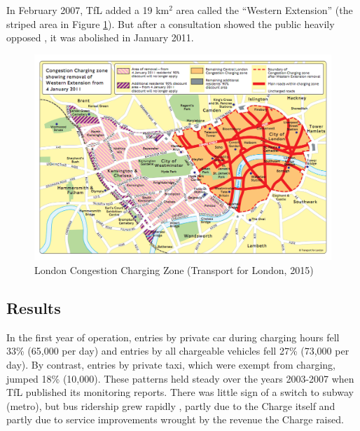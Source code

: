 In February 2007, TfL added a 19 km$^{2}$ area called the ``Western Extension'' (the striped area in Figure \ref{fig:London-Congestion-Charging}). But after a consultation showed the public heavily opposed \citep{TfL2008b}, it was abolished in January 2011.

\begin{figure}[ht]
\includegraphics[width=0.95\linewidth]{../img/london-congestion-charge.png}

\caption{London Congestion Charging Zone (Transport for London, 2015)\label{fig:London-Congestion-Charging}}
\end{figure}

\subsection{Results}

In the first year of operation, entries by private car during charging hours fell 33\% (65,000 per day) and entries by all chargeable vehicles fell 27\% (73,000 per day). By contrast, entries by private taxi, which were exempt from charging, jumped 18\% (10,000). These patterns held steady over the years 2003-2007 when TfL published its monitoring reports. There was little sign of a switch to subway (metro), but bus ridership grew rapidly \citep[p. 58]{TfLFifth2007}, partly due to the Charge itself and partly due to service improvements wrought by the revenue the Charge raised. 

